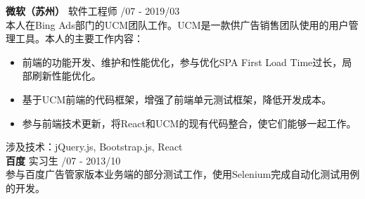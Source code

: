 \documentclass[a4paper]{article}
\newenvironment{changemargin}[2]{%
  \begin{list}{}{%
    \setlength{\topsep}{0pt}%
    \setlength{\leftmargin}{#1}%
    \setlength{\rightmargin}{#2}%
    \setlength{\listparindent}{\parindent}%
    \setlength{\itemindent}{\parindent}%
    \setlength{\parsep}{\parskip}%
  }%
  \item[]}{\end{list}
}
\newenvironment{body} {
	\vspace*{-16pt}
	\begin{changemargin}{-0.5in}{-0.5in}
  }	
	{\end{changemargin}
}
\begin{document}
\begin{body}
	\vspace{10pt}
	\textbf{微软（苏州）} \hfill 软件工程师 {/07 - 2019/03}\\ 
	\smallskip
	本人在{\fontarial Bing Ads}部门的{\fontarial UCM}团队工作。{\fontarial UCM}是一款供广告销售团队使用的用户管理工具。本人的主要工作内容：\\
	\vspace*{-2pt}
	\begin{itemize} \itemsep -0pt  %
		\item 前端的功能开发、维护和性能优化，参与优化{\fontarial SPA First Load Time}过长，局部刷新性能优化。\\
	\end{itemize}
	\vspace*{-10pt}
	\begin{itemize} \itemsep -0pt  %
		\item 基于{\fontarial UCM}前端的代码框架，增强了前端单元测试框架，降低开发成本。\\
	\end{itemize}
	\vspace*{-10pt}
	\begin{itemize} \itemsep -0pt  %
		\item 参与前端技术更新，将{\fontarial React}和{\fontarial UCM}的现有代码整合，使它们能够一起工作。\\
	\end{itemize}
	\vspace*{-4pt}
	涉及技术：{\fontarial jQuery.js, Bootstrap.js, React}\\

	\vspace{10pt}
	\textbf{百度} \hfill 实习生 {/07 - 2013/10}\\ 
	\smallskip
	参与百度广告管家{}版本业务端的部分测试工作，使用{\fontarial Selenium}完成自动化测试用例的开发。


\end{body}
\end{document}
